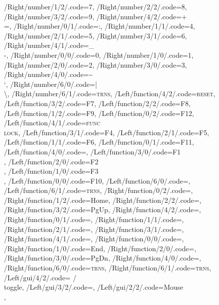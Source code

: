 \documentclass[]{article}
\begin{document}
{        /Right/number/1/2/.code=7,
        /Right/number/2/2/.code=8,
        /Right/number/3/2/.code=9,
        /Right/number/4/2/.code=+\\{=},
    /Right/number/0/1/.code=:,
        /Right/number/1/1/.code=4,
        /Right/number/2/1/.code=5,
        /Right/number/3/1/.code=6,
        /Right/number/4/1/.code=\_\\-,
    /Right/number/0/0/.code=0,
        /Right/number/1/0/.code=1,
        /Right/number/2/0/.code=2,
        /Right/number/3/0/.code=3,
        /Right/number/4/0/.code=\textasciitilde\\`,
    /Right/number/6/0/.code=|\\\textbackslash,
        /Right/number/6/1/.code=\textsc{trns},
%
%
    /Left/function/4/2/.code=\textsc{reset},
        /Left/function/3/2/.code=F7,
        /Left/function/2/2/.code=F8,
        /Left/function/1/2/.code=F9,
        /Left/function/0/2/.code=F12,
    /Left/function/4/1/.code=\textsc{func}\\\textsc{lock},
        /Left/function/3/1/.code=F4,
        /Left/function/2/1/.code=F5,
        /Left/function/1/1/.code=F6,
        /Left/function/0/1/.code=F11,
    /Left/function/4/0/.code=\shift,
        /Left/function/3/0/.code=F1\\\ctrl,
        /Left/function/2/0/.code=F2\\\Alt,
        /Left/function/1/0/.code=F3\\\cmd,
        /Left/function/0/0/.code=F10,
    /Left/function/6/0/.code=,
        /Left/function/6/1/.code=\textsc{trns},
%
    /Right/function/0/2/.code=\faVolumeUp,
        /Right/function/1/2/.code=Home,
        /Right/function/2/2/.code=\arrowkeyup,
        /Right/function/3/2/.code=PgUp,
        /Right/function/4/2/.code=\faSunO,
    /Right/function/0/1/.code=\faVolumeDown,
        /Right/function/1/1/.code=\arrowkeyleft,
        /Right/function/2/1/.code=\arrowkeydown,
        /Right/function/3/1/.code=\arrowkeyright,
        /Right/function/4/1/.code=\faCircleThin,
    /Right/function/0/0/.code=\faVolumeOff,
        /Right/function/1/0/.code=End,
        /Right/function/2/0/.code=,
        /Right/function/3/0/.code=PgDn,
        /Right/function/4/0/.code=\capslock,
    /Right/function/6/0/.code=\textsc{trns},
        /Right/function/6/1/.code=\textsc{trns},
%
%
    /Left/gui/4/2/.code=\faBluetoothB{} / \faUsb\\toggle,
        /Left/gui/3/2/.code=,
        /Left/gui/2/2/.code=Mouse\\\arrowkeyup,
}
\end{document}
